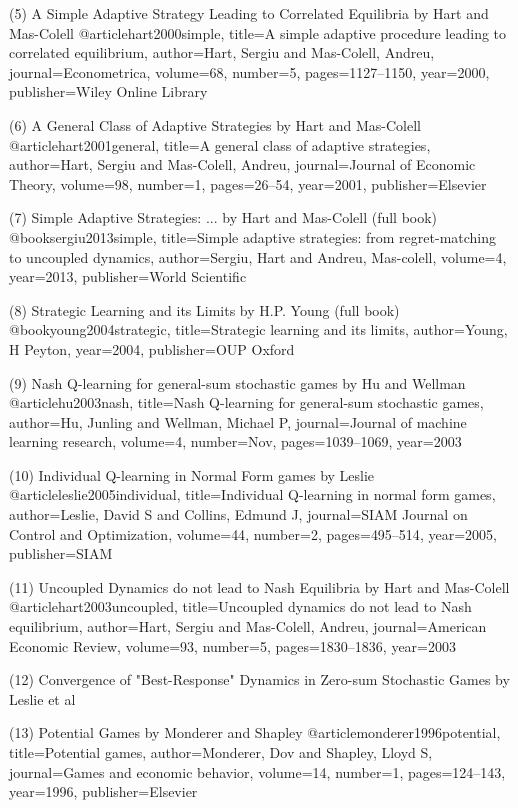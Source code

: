 (5) A Simple Adaptive Strategy Leading to Correlated Equilibria by Hart and Mas-Colell
@article{hart2000simple,
  title={A simple adaptive procedure leading to correlated equilibrium},
  author={Hart, Sergiu and Mas-Colell, Andreu},
  journal={Econometrica},
  volume={68},
  number={5},
  pages={1127--1150},
  year={2000},
  publisher={Wiley Online Library}
}

(6) A General Class of Adaptive Strategies by Hart and Mas-Colell
@article{hart2001general,
  title={A general class of adaptive strategies},
  author={Hart, Sergiu and Mas-Colell, Andreu},
  journal={Journal of Economic Theory},
  volume={98},
  number={1},
  pages={26--54},
  year={2001},
  publisher={Elsevier}
}

(7) Simple Adaptive Strategies: ... by Hart and Mas-Colell (full book)
@book{sergiu2013simple,
  title={Simple adaptive strategies: from regret-matching to uncoupled dynamics},
  author={Sergiu, Hart and Andreu, Mas-colell},
  volume={4},
  year={2013},
  publisher={World Scientific}
}

(8) Strategic Learning and its Limits by H.P. Young (full book)
@book{young2004strategic,
  title={Strategic learning and its limits},
  author={Young, H Peyton},
  year={2004},
  publisher={OUP Oxford}
}

(9) Nash Q-learning for general-sum stochastic games by Hu and Wellman
@article{hu2003nash,
  title={Nash Q-learning for general-sum stochastic games},
  author={Hu, Junling and Wellman, Michael P},
  journal={Journal of machine learning research},
  volume={4},
  number={Nov},
  pages={1039--1069},
  year={2003}
}

(10) Individual Q-learning in Normal Form games by Leslie
@article{leslie2005individual,
  title={Individual Q-learning in normal form games},
  author={Leslie, David S and Collins, Edmund J},
  journal={SIAM Journal on Control and Optimization},
  volume={44},
  number={2},
  pages={495--514},
  year={2005},
  publisher={SIAM}
}

(11) Uncoupled Dynamics do not lead to Nash Equilibria by Hart and Mas-Colell
@article{hart2003uncoupled,
  title={Uncoupled dynamics do not lead to Nash equilibrium},
  author={Hart, Sergiu and Mas-Colell, Andreu},
  journal={American Economic Review},
  volume={93},
  number={5},
  pages={1830--1836},
  year={2003}
}

(12) Convergence of "Best-Response" Dynamics in Zero-sum Stochastic Games by Leslie et al

(13) Potential Games by Monderer and Shapley
@article{monderer1996potential,
  title={Potential games},
  author={Monderer, Dov and Shapley, Lloyd S},
  journal={Games and economic behavior},
  volume={14},
  number={1},
  pages={124--143},
  year={1996},
  publisher={Elsevier}
}

